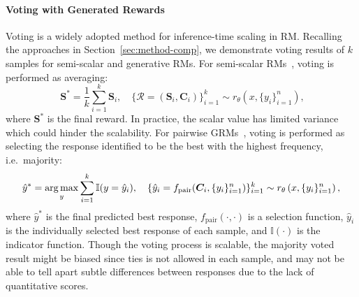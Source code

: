 \documentclass{article} %
\begin{document}
\paragraph{Voting with Generated Rewards}

Voting is a widely adopted method for inference-time scaling in RM. Recalling the approaches in Section~\ref{sec:method-comp}, we demonstrate voting results of $k$ samples for semi-scalar and generative RMs. For semi-scalar RMs~\citep{ankner2024critiqueoutloudrewardmodels,zhang2025generative}, voting is performed as averaging:
\begin{equation}~\label{eq:semi-scalar-voting}
  \boldsymbol{S}^* = \frac{1}{k} \sum_{i=1}^k \boldsymbol{S}_i, \quad \{\mathcal{R} = (\boldsymbol{S}_i, \boldsymbol{C}_i)\}_{i=1}^k \sim r_{\theta}\left(x, \{y_i\}_{i=1}^n\right),
\end{equation}
where $\boldsymbol{S}^*$ is the final reward. In practice, the scalar value has limited variance which could hinder the scalability. 
For pairwise GRMs~\citep{mahan2024generativerewardmodels,wang2024selftaughtevaluators}, voting is performed as selecting the response identified to be the best with the highest frequency, i.e.~majority:
\begin{equation}
  \hat{y}^* = \operatorname*{arg\,max}_{y} \sum_{i=1}^k \mathbb{I}(y = \hat{y}_i), \quad \{\hat{y}_i = f_{\mathrm{pair}}(\boldsymbol{C}_i, \{y_i\}_{i=1}^n)\}_{i=1}^k \sim r_{\theta}\left(x, \{y_i\}_{i=1}^n\right),
\end{equation}
where $\hat{y}^*$ is the final predicted best response, $f_{\mathrm{pair}}(\cdot, \cdot)$ is a selection function, $\hat{y}_i$ is the individually selected best response of each sample, and $\mathbb{I}(\cdot)$ is the indicator function. Though the voting process is scalable, the majority voted result might be biased since ties is not allowed in each sample, and may not be able to tell apart subtle differences between responses due to the lack of quantitative scores. 
\end{document}
